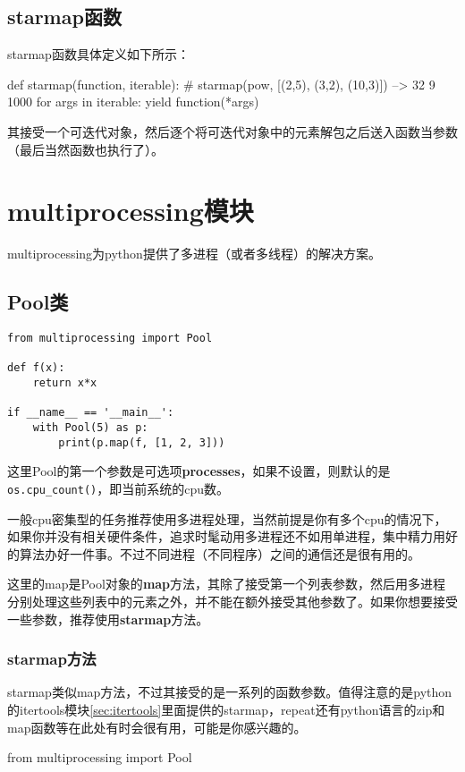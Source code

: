 \documentclass[12pt,oneside]{book}
\begin{document}
\begin{common-format}
\section{starmap函数}
starmap函数具体定义如下所示：
\begin{tcbpython}[]
def starmap(function, iterable):
    # starmap(pow, [(2,5), (3,2), (10,3)]) --> 32 9 1000
    for args in iterable:
        yield function(*args)
\end{tcbpython}
其接受一个可迭代对象，然后逐个将可迭代对象中的元素解包之后送入函数当参数（最后当然函数也执行了）。



\chapter{multiprocessing模块}
multiprocessing为python提供了多进程（或者多线程）的解决方案。

\section{Pool类}
\begin{Verbatim}
from multiprocessing import Pool

def f(x):
    return x*x

if __name__ == '__main__':
    with Pool(5) as p:
        print(p.map(f, [1, 2, 3]))
\end{Verbatim}
这里Pool的第一个参数是可选项\textbf{processes}，如果不设置，则默认的是\verb+os.cpu_count()+，即当前系统的cpu数。

一般cpu密集型的任务推荐使用多进程处理，当然前提是你有多个cpu的情况下，如果你并没有相关硬件条件，追求时髦动用多进程还不如用单进程，集中精力用好的算法办好一件事。不过不同进程（不同程序）之间的通信还是很有用的。

这里的map是Pool对象的\textbf{map}方法，其除了接受第一个列表参数，然后用多进程分别处理这些列表中的元素之外，并不能在额外接受其他参数了。如果你想要接受一些参数，推荐使用\textbf{starmap}方法。

\subsection{starmap方法}
starmap类似map方法，不过其接受的是一系列的函数参数。值得注意的是python的itertools模块\ref{sec:itertools}里面提供的starmap，repeat还有python语言的zip和map函数等在此处有时会很有用，可能是你感兴趣的。
\begin{tcbpython}[]
from multiprocessing import Pool


\end{tcbpython}
\end{common-format}
\end{document}
